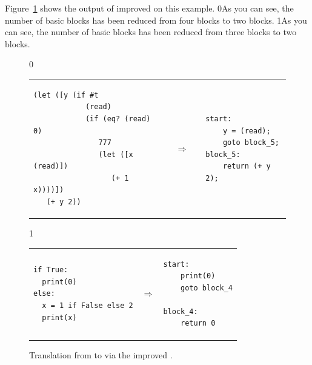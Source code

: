 \documentclass[7x10]{TimesAPriori_MIT}%
\def\racketEd{0}
\def\pythonEd{1}
\def\edition{1}
\newcommand{\racket}[1]{{\if\edition\racketEd{#1}\fi}}
\newcommand{\pythonColor}[0]{}
\newcommand{\python}[1]{{\if\edition\pythonEd\pythonColor #1\fi}}
\numberwithin{theorem}{chapter}
\numberwithin{definition}{chapter}
\numberwithin{equation}{chapter}
\begin{document}
Figure~\ref{fig:explicate-control-challenge} shows the output of
improved  on this example.
\racket{As you can see, the number of basic blocks has been reduced
  from four blocks to two blocks.}%
\python{As you can see, the number of basic blocks has been reduced
  from three blocks to two blocks.}

\begin{figure}[tbp]
  \begin{tcolorbox}[colback=white]
    {\if\edition\racketEd        
\begin{tabular}{lll}
\begin{minipage}{0.45\textwidth}
\begin{lstlisting}
(let ([y (if #t
            (read)
            (if (eq? (read) 0)
               777
               (let ([x (read)])
                  (+ 1 x))))])
   (+ y 2))
\end{lstlisting}
\end{minipage}
&
$\quad\Rightarrow\quad$
&
\begin{minipage}{0.4\textwidth}
\begin{lstlisting}
start:
    y = (read);
    goto block_5;
block_5:
    return (+ y 2);
\end{lstlisting}
\end{minipage}
\end{tabular} 
\fi}
{\if\edition\pythonEd\pythonColor
\begin{tabular}{lll}
\begin{minipage}{0.4\textwidth}
\begin{lstlisting}
if True:
  print(0)
else:
  x = 1 if False else 2
  print(x)
\end{lstlisting}
\end{minipage}
&
$\Rightarrow$
&
\begin{minipage}{0.55\textwidth}
\begin{lstlisting}
start:
    print(0)
    goto block_4
    
block_4:
    return 0
\end{lstlisting}
\end{minipage}
\end{tabular} 
\fi}
  \end{tcolorbox}

  \caption{Translation from \LangIf{} to \LangCIf{}
  via the improved .}
\label{fig:explicate-control-challenge}
\end{figure}
\end{document}
